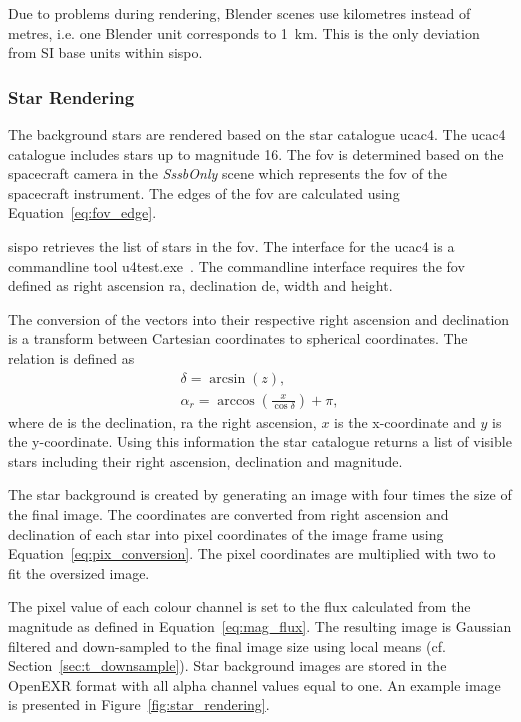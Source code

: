 Due to problems during rendering, Blender scenes use kilometres instead of metres, i.e. one Blender unit corresponds to \SI{1}{\kilo\meter}. This is the only deviation from SI base units within \gls{sispo}.

\subsubsection{Star Rendering} \label{sec:stars}
The background stars are rendered based on the star catalogue \gls{ucac4}. The \gls{ucac4} catalogue includes stars up to magnitude 16. The \gls{fov} is determined based on the spacecraft camera in the \textit{SssbOnly} scene which represents the \gls{fov} of the spacecraft instrument. The edges of the \gls{fov} are calculated using Equation~\ref{eq:fov_edge}.

\Gls{sispo} retrieves the list of stars in the \gls{fov}. The interface for the \gls{ucac4} is a commandline tool u4test.exe~\cite{gray}. The commandline interface requires the \gls{fov} defined as right ascension \gls{ra}, declination \gls{de}, width and height.

The conversion of the vectors into their respective right ascension and declination is a transform between Cartesian coordinates to spherical coordinates. The relation is defined as
\begin{align}
    \delta = \arcsin{(z)}, \label{eq:declination} \\
    \alpha_r = \arccos{\left(\frac{x}{\cos{\delta}}\right)} + \pi, \label{eq:right_ascension}
\end{align}
where \gls{de} is the declination, \gls{ra} the right ascension, $x$ is the x-coordinate and $y$ is the y-coordinate. Using this information the star catalogue returns a list of visible stars including their right ascension, declination and magnitude.

The star background is created by generating an image with four times the size of the final image. The coordinates are converted from right ascension and declination of each star into pixel coordinates of the image frame using Equation~\ref{eq:pix_conversion}. The pixel coordinates are multiplied with two to fit the oversized image.

The pixel value of each colour channel is set to the flux calculated from the magnitude as defined in Equation~\ref{eq:mag_flux}. The resulting image is Gaussian filtered and down-sampled to the final image size using local means (cf. Section~\ref{sec:t_downsample}). Star background images are stored in the OpenEXR format with all alpha channel values equal to one. An example image is presented in Figure~\ref{fig:star_rendering}.

